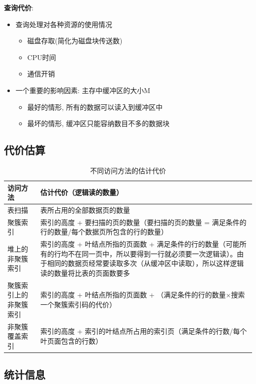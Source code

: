 \textbf{查询代价}:
\begin{itemize}
    \item 查询处理对各种资源的使用情况
    \begin{itemize}
        \item 磁盘存取(简化为磁盘块传送数)
        \item CPU时间
        \item 通信开销
    \end{itemize}
    \item 一个重要的影响因素: 主存中缓冲区的大小M
    \begin{itemize}
        \item 最好的情形, 所有的数据可以读入到缓冲区中
        \item 最坏的情形, 缓冲区只能容纳数目不多的数据块
    \end{itemize}
\end{itemize}

\subsection{代价估算}

\begin{table}[H]
\centering
\begin{tabular}{|p{5cm}|p{10cm}|}
\hline
\textbf{访问方法} & \textbf{估计代价（逻辑读的数量）} \\ \hline
表扫描 & 表所占用的全部数据页的数量 \\ \hline
聚簇索引 & 索引的高度 + 要扫描的页的数量（要扫描的页的数量 = 满足条件的行的数量/每个数据页所包含的行的数量） \\ \hline
堆上的非聚簇索引 & 索引的高度 + 叶结点所指的页面数 + 满足条件的行的数量（可能所有的行均不在同一页中，所以要得到一行就必须要一次逻辑读）。由于相同的数据页经常要读取多次（从缓冲区中读取），所以这样逻辑读的数量将比表的页面数要多 \\ \hline
聚簇索引上的非聚簇索引 & 索引的高度 + 叶结点所指的页面数 + （满足条件的行的数量×搜索一个聚簇索引码的代价） \\ \hline
非聚簇覆盖索引 & 索引的高度 + 索引的叶结点所占用的索引页（满足条件的行数/每个叶页面包含的行数） \\ \hline
\end{tabular}
\caption{不同访问方法的估计代价}
\label{tab:access_methods_cost_simple}
\end{table}

\subsection{统计信息}

